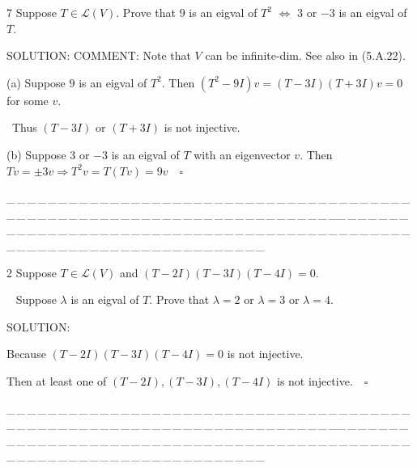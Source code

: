 \documentclass[a4paper, 11pt, UTF8]{article}
\def\Lm{\mathcal{L}}
\begin{document}
\begin{large}
{\timesbf\Large 7} {\timessl\Large 
Suppose $T\in\Lm(V)$. Prove that $9$ is an eigval of $T^2$ $\Longleftrightarrow$ $3$ or $-3$ is an eigval of $T$.}\par
{\timesbf S\footnotesize{OLUTION:}} C{\small OMMENT:} Note that $V$ can be infinite-dim. See also in (5.A.22).\par\quad
(a) Suppose $9$ is an eigval of $T^2.$ 
Then $(T^2-9I)v=(T-3I)(T+3I)v=0$ for some $v.$\par\qquad\,
Thus $(T-3I)$ or $(T+3I)$ is not injective.\par\quad
(b) Suppose $3$ or $-3$ is an eigval of $T$ with an eigenvector $v.$ Then $Tv=\pm 3v\Rightarrow T^2 v=T(Tv)=9v\quad\square$\par
\par
{\tiny \_\,\_\,\_\,\_\,\_\,\_\,\_\,\_\,\_\,\_\,\_\,\_\,\_\,\_\,\_\,\_\,\_\,\_\,\_\,\_\,\_\,\_\,\_\,\_\,\_\,\_\,\_\,\_\,\_\,\_\,\_\,\_\,\_\,\_\,\_\,\_\,\_\,\_\,\_\,\_\,\_\,\_\,\_\,\_\,\_\,\_\,\_\,\_\,\_\,\_\,\_\,\_\,\_\,\_\,\_\,\_\,\_\,\_\,\_\,\_\,\_\,\_\,\_\,\_\,\_\,\_\,\_\,\_\,\_\,\_\,\_\_\,\_\,\_\,\_\,\_\,\_\,\_\,\_\,\_\,\_\,\_\,\_\,\_\,\_\,\_\,\_\,\_\,\_\,\_\,\_\,\_\,\_\,\_\,\_\,\_\,\_\,\_\,\_\,\_\,\_\,\_\,\_\,\_\,\_\,\_\,\_\,\_\,\_\,\_\,\_\,\_\,\_\,\_\,\_\,\_\,\_\,\_\,\_\,\_\,\_\,\_\,\_\,\_\,\_\,\_\,\_\,\_\,\_\,\_\,\_\,\_\,\_\,\_\,\_\,\_\,\_\,\_\,\_\,\_\,\_\,\_}\par

{\timesbf\Large 2} {\timessl\Large 
Suppose $T\in\Lm(V)$ and $(T - 2I)(T - 3I)(T - 4I) = 0$.}\par\,\,\,
{\timessl\Large Suppose $\lambda$ is an eigval of $T$. Prove that $\lambda = 2$ or $\lambda = 3$ or $\lambda = 4$.
}\par
{\timesbf S\footnotesize{OLUTION:}}\par\quad
Because $(T-2I)(T-3I)(T-4I)=0$ is not injective.\par\quad
Then at least one of $(T-2I),(T-3I),(T-4I)$ is not injective.$\quad\square$\par
{\tiny \_\,\_\,\_\,\_\,\_\,\_\,\_\,\_\,\_\,\_\,\_\,\_\,\_\,\_\,\_\,\_\,\_\,\_\,\_\,\_\,\_\,\_\,\_\,\_\,\_\,\_\,\_\,\_\,\_\,\_\,\_\,\_\,\_\,\_\,\_\,\_\,\_\,\_\,\_\,\_\,\_\,\_\,\_\,\_\,\_\,\_\,\_\,\_\,\_\,\_\,\_\,\_\,\_\,\_\,\_\,\_\,\_\,\_\,\_\,\_\,\_\,\_\,\_\,\_\,\_\,\_\,\_\,\_\,\_\,\_\,\_\_\,\_\,\_\,\_\,\_\,\_\,\_\,\_\,\_\,\_\,\_\,\_\,\_\,\_\,\_\,\_\,\_\,\_\,\_\,\_\,\_\,\_\,\_\,\_\,\_\,\_\,\_\,\_\,\_\,\_\,\_\,\_\,\_\,\_\,\_\,\_\,\_\,\_\,\_\,\_\,\_\,\_\,\_\,\_\,\_\,\_\,\_\,\_\,\_\,\_\,\_\,\_\,\_\,\_\,\_\,\_\,\_\,\_\,\_\,\_\,\_\,\_\,\_\,\_\,\_\,\_\,\_\,\_\,\_\,\_\,\_}\par


\end{large}
\end{document}
